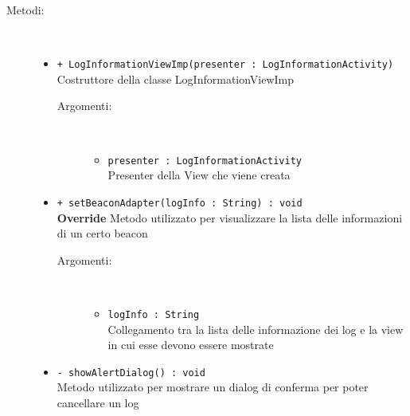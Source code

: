 \documentclass[../DefinizioneDiProdotto.tex]{subfiles}
\begin{document}
\begin{description}
\begin{itemize}
	\end{itemize}
	\item[Metodi:] \
	\begin{itemize}
		\item \texttt{+ LogInformationViewImp(presenter : LogInformationActivity)}\\
		Costruttore della classe LogInformationViewImp
		\begin{description}
			\item[Argomenti:] \
			\begin{itemize}
				\item \texttt{presenter : LogInformationActivity}\\
				Presenter della View che viene creata\end{itemize}
		\end{description}
		\item \texttt{+ setBeaconAdapter(logInfo : String) : void}\\
		\textbf{Override} Metodo utilizzato per visualizzare la lista delle informazioni di un certo beacon
		\begin{description}
			\item[Argomenti:] \
			\begin{itemize}
				\item \texttt{logInfo : String}\\
				Collegamento tra la lista delle informazione dei log e la view in cui esse devono essere mostrate\end{itemize}
		\end{description}
		\item \texttt{- showAlertDialog() : void}\\
		Metodo utilizzato per mostrare un dialog di conferma per poter cancellare un log
	\end{itemize}
\end{description}
\end{document}
